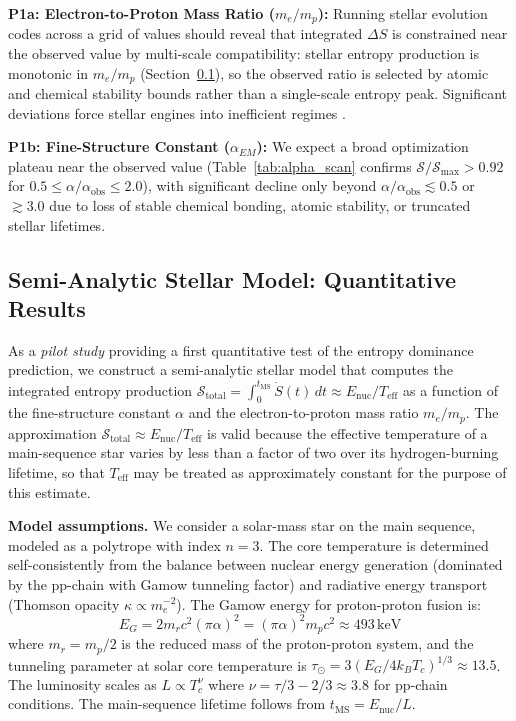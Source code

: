 \documentclass[12pt,a4paper]{article}
\theoremstyle{remark}
\begin{document}
\textbf{P1a: Electron-to-Proton Mass Ratio ($m_e/m_p$):} Running stellar evolution codes across a grid of values should reveal that integrated $\Delta S$ is constrained near the observed value by multi-scale compatibility: stellar entropy production is monotonic in $m_e/m_p$ (Section~\ref{sec:stellar_model}), so the observed ratio is selected by atomic and chemical stability bounds rather than a single-scale entropy peak. Significant deviations force stellar engines into inefficient regimes \citep{Adams2019}.

\textbf{P1b: Fine-Structure Constant ($\alpha_{EM}$):} We expect a broad optimization plateau near the observed value (Table~\ref{tab:alpha_scan} confirms $\mathcal{S}/\mathcal{S}_{\max} > 0.92$ for $0.5 \leq \alpha/\alpha_{\text{obs}} \leq 2.0$), with significant decline only beyond $\alpha/\alpha_{\text{obs}} \lesssim 0.5$ or $\gtrsim 3.0$ due to loss of stable chemical bonding, atomic stability, or truncated stellar lifetimes.

\subsection{Semi-Analytic Stellar Model: Quantitative Results}
\label{sec:stellar_model}

As a \emph{pilot study} providing a first quantitative test of the entropy dominance prediction, we construct a semi-analytic stellar model that computes the integrated entropy production $\mathcal{S}_{\text{total}} = \int_0^{t_{\text{MS}}} \dot{S}(t)\,dt \approx E_{\text{nuc}} / T_{\text{eff}}$ as a function of the fine-structure constant $\alpha$ and the electron-to-proton mass ratio $m_e/m_p$. The approximation $\mathcal{S}_{\text{total}} \approx E_{\text{nuc}} / T_{\text{eff}}$ is valid because the effective temperature of a main-sequence star varies by less than a factor of two over its hydrogen-burning lifetime, so that $T_{\text{eff}}$ may be treated as approximately constant for the purpose of this estimate.

\textbf{Model assumptions.} We consider a solar-mass star on the main sequence, modeled as a polytrope with index $n = 3$. The core temperature is determined self-consistently from the balance between nuclear energy generation (dominated by the pp-chain with Gamow tunneling factor) and radiative energy transport (Thomson opacity $\kappa \propto m_e^{-2}$). The Gamow energy for proton-proton fusion is:
\begin{equation}
E_G = 2 m_r c^2 (\pi \alpha)^2 = (\pi \alpha)^2 m_p c^2 \approx 493\,\text{keV}
\end{equation}
where $m_r = m_p/2$ is the reduced mass of the proton-proton system, and the tunneling parameter at solar core temperature is $\tau_\odot = 3(E_G / 4 k_B T_c)^{1/3} \approx 13.5$. The luminosity scales as $L \propto T_c^{\nu}$ where $\nu = \tau/3 - 2/3 \approx 3.8$ for pp-chain conditions. The main-sequence lifetime follows from $t_{\text{MS}} = E_{\text{nuc}} / L$.
\end{document}

